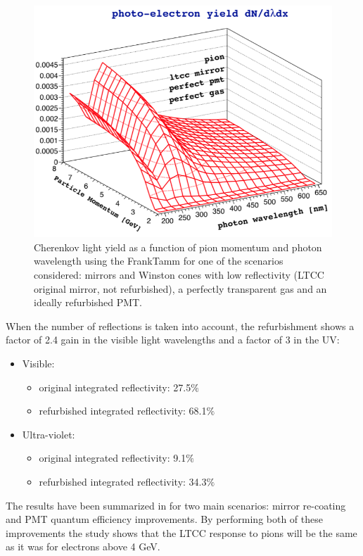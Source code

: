 \begin{figure}
	\centering
	\includegraphics[width=0.98\columnwidth, height=0.75\columnwidth]{img/photonYieldStudy.png}
	\caption{Cherenkov light yield as a function of pion momentum and photon wavelength using the Frank\textendash Tamm for one of the scenarios considered:
            mirrors and Winston cones with low reflectivity (LTCC original mirror, not refurbished), a perfectly transparent gas and an ideally refurbished PMT.}
	\label{fig:photonYieldStudy}
\end{figure}


When the number of reflections is taken into account, the refurbishment shows
a factor of 2.4 gain in the visible light wavelengths and a factor of 3 in the UV:

\begin{itemize}
	\item Visible:
	\begin{itemize}
		\item original integrated reflectivity: 27.5$\%$
		\item refurbished integrated reflectivity: 68.1$\%$
	\end{itemize}
	\item Ultra-violet:
	\begin{itemize}
		\item original integrated reflectivity: 9.1$\%$
		\item refurbished integrated reflectivity: 34.3$\%$
	\end{itemize}
\end{itemize}


The results have been summarized in  for two main scenarios: mirror re-coating and PMT quantum efficiency improvements.
By performing both of these improvements the study shows that the LTCC response to pions will be the same as it was for electrons above 4 GeV.


